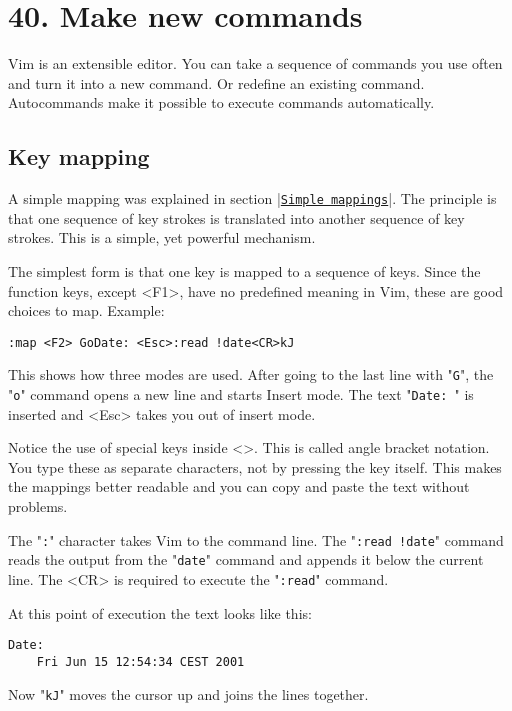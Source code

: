 \section{40. Make new commands}
Vim is an extensible editor.
You can take a sequence of commands you use often and turn it into a new command.
Or redefine an existing command.
Autocommands make it possible to execute commands automatically.
\subsection{Key mapping}
\label{Key mapping}
A simple mapping was explained in section |\hyperref[Simple mappings]{\texttt{Simple mappings}}|.
The principle is that one sequence of key strokes is translated into another sequence of key strokes.
This is a simple, yet powerful mechanism.

The simplest form is that one key is mapped to a sequence of keys.
Since the function keys, except <F1>, have no predefined meaning in Vim, these are good choices to map.
Example:

\begin{Verbatim}[samepage=true]
 :map <F2> GoDate: <Esc>:read !date<CR>kJ
\end{Verbatim}

This shows how three modes are used.
After going to the last line with "\verb!G!", the "\verb!o!" command opens a new line and starts Insert mode.
The text "\verb!Date: !" is inserted and <Esc> takes you out of insert mode.

Notice the use of special keys inside <>.
This is called angle bracket notation.
You type these as separate characters, not by pressing the key itself.
This makes the mappings better readable and you can copy and paste the text without problems.

The "\verb!:!" character takes Vim to the command line.
The "\verb_:read !date_" command reads the output from the "\verb!date!" command and appends it below the current line.
The <CR> is required to execute the "\verb!:read!" command.

At this point of execution the text looks like this:

\begin{Verbatim}[samepage=true]
    Date:  
    Fri Jun 15 12:54:34 CEST 2001 
\end{Verbatim}

Now "\verb!kJ!" moves the cursor up and joins the lines together.

